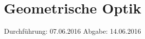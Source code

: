 

\subject{V408}
\title{Geometrische Optik}
\date{
  Durchführung: 07.06.2016
  \hspace{3em}
  Abgabe: 14.06.2016
}



\maketitle
\thispagestyle{empty}
\tableofcontents
\newpage

%





\printbibliography


